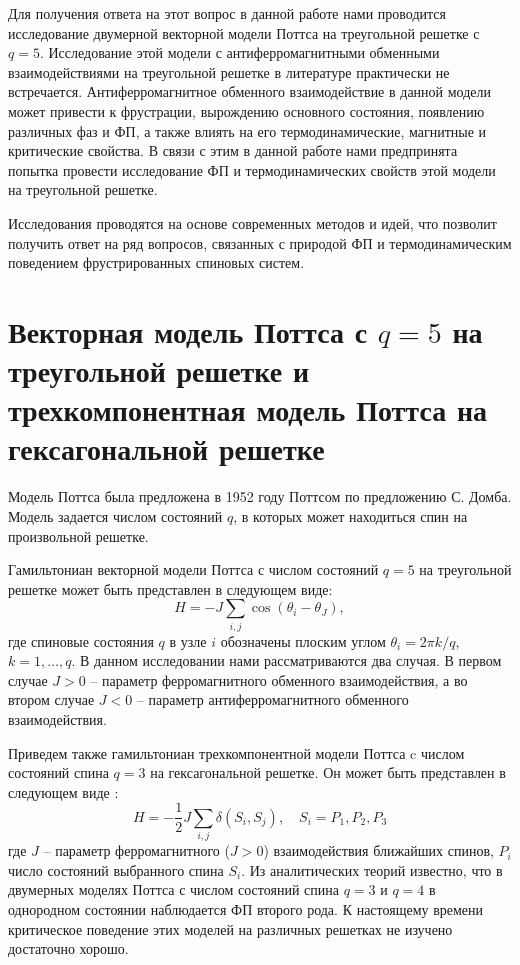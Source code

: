Для получения ответа на этот вопрос в данной работе нами проводится исследование двумерной векторной модели Поттса на треугольной решетке с $q = 5$. Исследование этой модели с антиферромагнитными обменными взаимодействиями на треугольной решетке в литературе практически не встречается. Антиферромагнитное обменного взаимодействие в данной модели может привести к фрустрации, вырождению основного состояния, появлению различных фаз и ФП, а также влиять на его термодинамические, магнитные и критические свойства. В связи с этим в данной работе нами предпринята попытка провести исследование ФП и термодинамических свойств этой модели на треугольной решетке.

Исследования проводятся на основе современных методов и идей, что позволит получить ответ на ряд вопросов, связанных с природой ФП и термодинамическим поведением фрустрированных спиновых систем.

\section{Векторная модель Поттса с \texorpdfstring{$q=5$}{q=5} на треугольной решетке и трехкомпонентная модель Поттса на гексагональной решетке}

Модель Поттса была предложена в 1952 году Поттсом по предложению С. Домба. Модель задается числом состояний $q$, в которых может находиться спин на произвольной решетке.

Гамильтониан векторной модели Поттса с числом состояний $q=5$ на треугольной решетке может быть представлен в следующем виде:
\begin{equation*}
    H = -J \sum_{i, j} \cos \left(\theta_i - \theta_J\right),
\end{equation*}
где спиновые состояния $q$ в узле $i$ обозначены плоским углом $\theta_i = 2\pi k/q$, $k = 1, \dots, q$. В данном исследовании нами рассматриваются два случая. В первом случае $J > 0$ -- параметр ферромагнитного обменного взаимодействия, а во втором случае $J < 0$ -- параметр антиферромагнитного обменного взаимодействия.


Приведем также гамильтониан трехкомпонентной модели Поттса c числом состояний спина $q=3$ на гексагональной решетке. Он может быть представлен в следующем виде \cite{bib:bab-8, bib:bab-9}:
\begin{equation*}
    H = -\frac{1}{2} J \sum_{i, j} \delta(S_i, S_j), \quad S_i = P_1, P_2, P_3
\end{equation*}
где $J$ -- параметр ферромагнитного ($J>0$) взаимодействия ближайших спинов, $P_i$ число состояний выбранного спина $S_i$. Из аналитических теорий известно, что в двумерных моделях Поттса с числом состояний спина $q=3$ и $q=4$ в однородном состоянии наблюдается ФП второго рода. К настоящему времени критическое поведение этих моделей на различных решетках не изучено достаточно хорошо.

